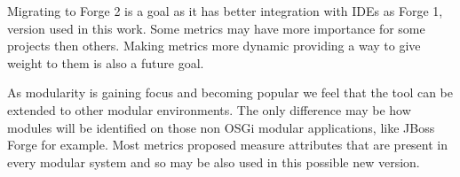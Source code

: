 Migrating to Forge 2 is a goal as it has better integration with IDEs as Forge 1, version used in this work. 
Some metrics may have more importance for some projects then others. Making metrics more dynamic providing a way to give weight to them is also a future goal.

As modularity is gaining focus and becoming popular we feel that the tool can be extended to other modular environments. The only difference may be how modules will be identified on those non OSGi modular applications, like JBoss Forge for example. Most metrics proposed measure attributes that are present in every modular system and so may be also used in this possible new version. 

